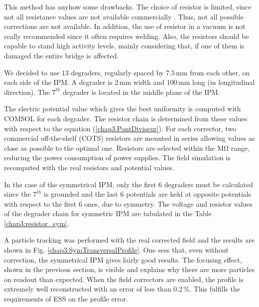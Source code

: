 \begin{refsection}
  

  This method has anyhow some drawbacks. The choice of resistor is limited, since not all resistance values are not available commercially \cite{Vishay2012}. Thus, not all possible corrections are not available. In addition, the use of resistor in a vacuum is not really recommended since it often requires welding. Also, the resistors should be capable to stand  high activity levels, mainly considering that, if one of them is damaged the entire bridge is affected.

  We decided to use $13$ degraders, regularly spaced by $7.5\,\mathrm{mm}$ from each other, on each side of the IPM. A degrader is $2\,\mathrm{mm}$ width and $100\,\mathrm{mm}$ long (in longitudinal direction). The $7^{th}$ degrader is located in the middle plane of the IPM.

  The electric potential value which gives the best uniformity is computed with COMSOL for each degrader. The resistor chain is determined from these values with respect to the equation (\ref{chap3:PontDiviseur}). For each corrector, two commercial off-the-shelf (COTS) resistors are mounted in series allowing values as close as possible to the optimal one. Resistors are selected within the $\mathrm{M\Omega}$ range, reducing the power consumption of power supplies. The field simulation is recomputed with the real resistors and potential values.

  In the case of the symmetrical IPM, only the first $6$ degraders must be calculated since the $7^{th}$ is grounded and the last $6$ potentials are held at opposite potentials with respect to  the first 6 ones, due to symmetry. The voltage and resistor values of the degrader chain for symmetric IPM are tabulated in the Table \ref{chap3:resistor_sym}.

  

  A particle tracking was performed with the real corrected field and the results are shown in Fig. \ref{chap3:SymTransversalProfile}. One sees that, even without correction, the symmetrical IPM gives fairly good results. The focusing effect, shown in the previous section, is visible and explains why there are more particles on readout than expected. When the field correctors are enabled, the profile is extremely well reconstructed with an error of less than $0.2\,\mathrm{\%}$.  This fulfills the requirements of ESS on the profile error.

  


\end{refsection}
